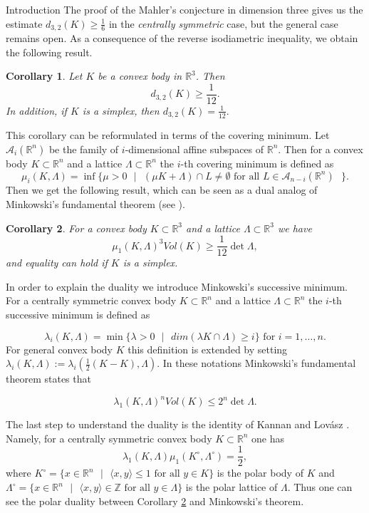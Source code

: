 \documentclass[12pt]{article}
\newcommand\R{\mathbb R}
\newtheorem{Corollary}{Corollary}[section]
\begin{document}
\begin{section}{Introduction}
    The proof of the Mahler's conjecture in dimension three gives us the estimate  $d_{3,2}(K)\geq \frac{1}{6}$ in the \textit{centrally symmetric} case, but the general case remains open. 
    As a consequence of the reverse isodiametric inequality, we obtain the following result. 
    
    \begin{Corollary}
    \label{d32}
         Let $K$ be a convex body in $\R^{3}$. Then 
         $$
            d_{3,2}(K)\geq \frac{1}{12}.
         $$
    In addition, if $K$ is a simplex, then $d_{3,2}(K) = \frac{1}{12}.$
    \end{Corollary}

    This corollary can be reformulated in terms of the covering minimum. Let $\mathcal{A}_{i}(\mathbb{R}^{n})$ be the family of $i$-dimensional affine subspaces of $\mathbb{R}^{n}$. Then for a convex body $K\subset \mathbb{R}^{n}$ and a lattice $\Lambda \subset \mathbb{R}^{n}$ the $i$-th covering minimum is defined as 
    $$
        \mu_{i}(K, \Lambda) = \inf\{\mu > 0 \text{ }\vert\text{ } (\mu K + \Lambda) \cap L \neq \emptyset \text{ for all $L \in \mathcal{A}_{n-i}(\mathbb{R}^{n})$ }\}.
    $$
    Then we get the following result, which can be seen as a dual analog of Minkowski’s fundamental theorem (see \cite{bernardo}). 
    \begin{Corollary}
    \label{cor1.2}
        For a convex body $K \subset \mathbb{R}^{3}$ and a lattice $\Lambda \subset \mathbb{R}^{3}$ we have 
        $$
            \mu_{1}(K, \Lambda)^{3}Vol(K) \geq \frac{1}{12}\det \Lambda,
        $$
        and equality can hold if $K$ is a simplex.
    \end{Corollary}

    In order to explain the duality we introduce Minkowski’s successive minimum. For a centrally symmetric convex body $K\subset \mathbb{R}^{n}$ and a lattice $\Lambda \subset \mathbb{R}^{n}$ the $i$-th successive minimum is defined as 

    $$
        \lambda_{i}(K,\Lambda) = \min \{\lambda > 0 \text{ }\vert \text{ } dim(\lambda K \cap \Lambda) \geq i\} \text{ for $i=1,\ldots, n$}.
    $$
    For general convex body $K$ this definition is extended by setting $\lambda_{i}(K,\Lambda) := \lambda_{i}(\frac{1}{2}(K-K), \Lambda).$ In these notations 
 Minkowski’s fundamental theorem states that 

$$
    \lambda_{1}(K,\Lambda)^{n}Vol(K)\leq 2^{n}\det \Lambda.
$$

The last step to understand the duality is the identity of Kannan and Lovász \cite{lovasz}. Namely, for a centrally symmetric convex body $K\subset \mathbb{R}^{n}$ one has 
$$
    \lambda_{1}(K,\Lambda)\mu_{1}(K^{\circ}, \Lambda^{\circ}) = \frac{1}{2},
$$
where $K^{\circ} = \{x\in\mathbb{R}^{n} \text{ }\vert\text{ }\langle x,y\rangle\leq 1 \text{ for all }y\in K\}$ is the polar body of $K$ and $\Lambda^{\circ} = \{x\in \mathbb{R}^{n} \text{ }\vert\text{ }\langle x,y\rangle \in \mathbb{Z} \text{ for all }y\in \Lambda\}$ is the polar lattice of $\Lambda$. Thus one can see the polar duality between Corollary \ref{cor1.2} and Minkowski’s theorem.


\end{section}
\end{document}
